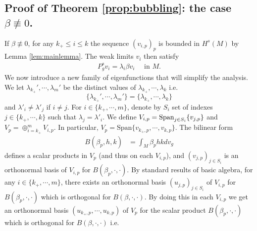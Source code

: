 \documentclass[10pt]{amsart}
\numberwithin{equation}{section}
\def\be{{\beta}}
\def\la{{\lambda}}
\def\span{{\mathop{\rm Span}}}
\theoremstyle{plain}
\theoremstyle{remark}
\begin{document}
\subsection{Proof of Theorem \ref{prop:bubbling}: the case $\beta \not \equiv 0$.} If $\beta \not \equiv 0$, for any $k_+ \le i \le k$ the sequence $(v_{i,p})_p$ is bounded in $H^s(M)$ by Lemma \ref{lem:mainlemma}. The weak limits $v_i$ then satisfy 
\begin{eqnarray} \label{eqwlim}
P_g^s v_i  =  \la_i \beta v_i \quad \text{ in } M.
\end{eqnarray}
We now introduce a new family of eigenfunctions that will simplify the analysis. We let $\la_{k_+}',\cdots, \la_m'$ be the distinct values of $\la_{k_+} ,\cdots,\la_k$ i.e. 
$$\{ \la_{k_+}',\cdots, \la_m' \}= \{\la_{k_+},\cdots,\la_k\}$$
and $\la'_i \not=\la'_j$ if $i \not= j$. 
For $i \in \{k_+,\cdots,m\}$, denote by $S_i$ set of indexes $j \in \{k_+,\cdots, k\}$ such that $\la_j = \la'_i$. 
We define $V_{i,p}= \span_{j \in S_i} \{v_{j,p}\}$ and $V_p = \oplus_{i=k_+}^m V_{i,p}$. In particular, $V_p = \text{Span} \big\{ v_{k_+,p}, \cdots, v_{k,p} \big\}$. 
The bilinear form
$$\begin{aligned}
B(\beta_p,h,k)& = \int_M \beta_p h k dv_g 
\end{aligned} $$
defines a scalar products in $V_p$ (and thus on each $V_{i,p}$), and $(v_{j,p})_{j \in S_i}$ is an orthonormal basis of $V_{i,p}$ for $B(\beta_p, \cdot, \cdot)$. By standard results of basic algebra, for any $i \in \{k_+, \cdots, m\}$, there exists an orthonormal basis $(u_{j,p})_{j \in S_i}$ of $V_{i,p}$ for $B(\be_p, \cdot,\cdot)$ which is orthogonal for $B(\beta, \cdot, \cdot)$. By doing this in each $V_{i,p}$ we get an orthonormal basis $(u_{k_+,p},\cdots,u_{k,p})$ of $V_p$ for the scalar product $B(\be_p, \cdot,\cdot)$ which is orthogonal for $B(\beta, \cdot, \cdot)$ i.e. 
\end{document}
